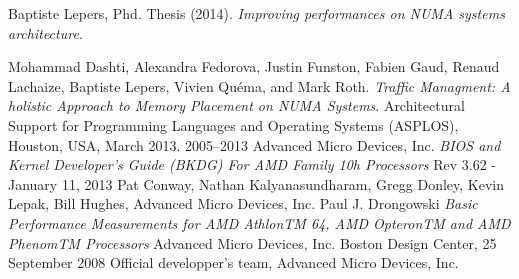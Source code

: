 \newpage
\begin{thebibliography}{99}

   Baptiste Lepers, Phd. Thesis (2014).
    \newblock \textit{Improving performances on NUMA systems architecture.}
  
   Mohammad Dashti, Alexandra Fedorova, Justin Funston,
    Fabien Gaud, Renaud Lachaize, Baptiste Lepers, Vivien Quéma, and Mark
    Roth.
    \newblock \textit{Traffic Managment: A holistic Approach to Memory
      Placement on NUMA Systems}.
    \newblock Architectural Support for Programming Languages and Operating
    Systems (ASPLOS), Houston, USA, March 2013.
   2005–2013 Advanced Micro Devices, Inc.
  	\newblock \textit{BIOS and Kernel Developer’s Guide (BKDG) For AMD Family 10h Processors}
  	Rev 3.62  - January 11, 2013
  Pat Conway, Nathan Kalyanasundharam, Gregg Donley, Kevin Lepak, Bill Hughes, Advanced Micro Devices, Inc.
  Paul J. Drongowski
  	\newblock \textit{Basic Performance Measurements for AMD AthlonTM 64, AMD OpteronTM and AMD PhenomTM Processors}
  	Advanced Micro Devices, Inc. Boston Design Center, 25 September 2008
  Official developper's team, Advanced Micro Devices, Inc.

\end{thebibliography}
